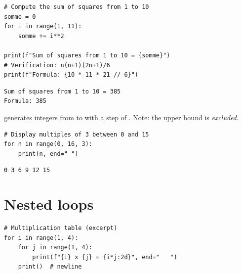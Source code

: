 \begin{codeblock}[title=\textbf{Python}]
\begin{verbatim}
# Compute the sum of squares from 1 to 10
somme = 0
for i in range(1, 11):
    somme += i**2

print(f"Sum of squares from 1 to 10 = {somme}")
# Verification: n(n+1)(2n+1)/6
print(f"Formula: {10 * 11 * 21 // 6}")
\end{verbatim}
\end{codeblock}

\begin{codeoutput}
\begin{verbatim}
Sum of squares from 1 to 10 = 385
Formula: 385
\end{verbatim}
\end{codeoutput}

\begin{definition}
 generates integers from  to  with a step of .
Note: the upper bound  is \emph{excluded}.
\end{definition}

\begin{codeblock}[title=\textbf{Python}]
\begin{verbatim}
# Display multiples of 3 between 0 and 15
for n in range(0, 16, 3):
    print(n, end=" ")
\end{verbatim}
\end{codeblock}

\begin{codeoutput}
\begin{verbatim}
0 3 6 9 12 15
\end{verbatim}
\end{codeoutput}

\section{Nested loops}

\begin{codeblock}[title=\textbf{Python}]
\begin{verbatim}
# Multiplication table (excerpt)
for i in range(1, 4):
    for j in range(1, 4):
        print(f"{i} x {j} = {i*j:2d}", end="   ")
    print()  # newline
\end{verbatim}
\end{codeblock}


